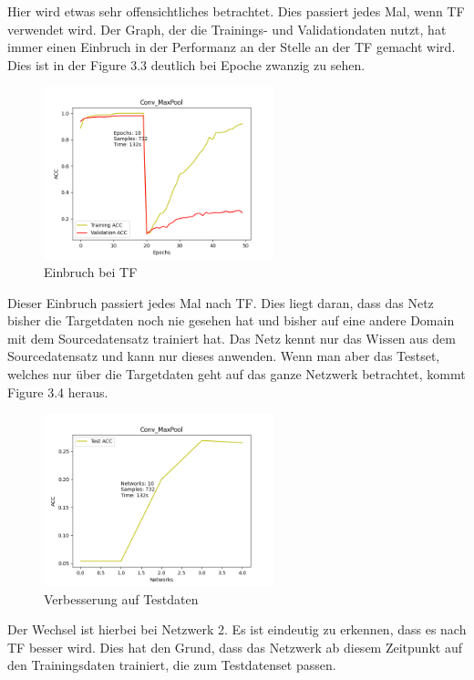 Hier wird etwas sehr offensichtliches betrachtet. Dies passiert jedes Mal, wenn TF verwendet wird. 
Der Graph, der die Trainings- und Validationdaten nutzt, hat immer einen Einbruch in der Performanz an der Stelle an 
der TF gemacht wird. Dies ist in der Figure 3.3 deutlich bei Epoche zwanzig zu sehen.

\begin{figure}[htpb]
    \includegraphics[height=5cm]{../../Plots/ba_plots/convmaxpool/convmaxpooltrain.png}
    \caption{\label{fig:convmaxpooltrain} Einbruch bei TF}
\end{figure}

Dieser Einbruch passiert jedes Mal nach TF. Dies liegt daran, dass das Netz bisher die Targetdaten noch nie gesehen hat und bisher 
auf eine andere Domain mit dem Sourcedatensatz trainiert hat. Das Netz kennt nur das Wissen aus dem Sourcedatensatz und kann nur dieses 
anwenden. Wenn man aber das Testset, welches nur über die Targetdaten geht auf das ganze Netzwerk betrachtet, kommt Figure 3.4 heraus. 

\begin{figure}[htpb]
    \includegraphics[height=5cm]{../../Plots/ba_plots/convmaxpool/convmaxpooltest.png}
    \caption{\label{fig:convmaxpooltest} Verbesserung auf Testdaten}
\end{figure}

Der Wechsel ist hierbei bei Netzwerk 2. Es ist eindeutig zu erkennen, dass es nach TF besser wird. Dies hat den Grund, dass das Netzwerk 
ab diesem Zeitpunkt auf den Trainingsdaten trainiert, die zum Testdatenset passen. 
